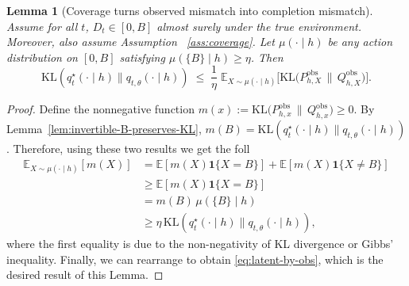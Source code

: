 \documentclass[11pt]{article}
\newtheorem{lemma}{Lemma}
\begin{document}
\begin{lemma}[Coverage turns observed mismatch into completion mismatch]\label{lem:coverage-obs-to-latent}
Assume for all $t$, $D_t\in[0,B]$ almost surely under the true environment. Moreover, also assume Assumption ~\ref{ass:coverage}. Let $\mu(\cdot\mid h)$ be any action distribution on $[0,B]$ satisfying $\mu(\{B\}\mid h)\ge\eta$.
Then
\begin{equation}\label{eq:latent-by-obs}
\mathrm{KL}(q_t^\star(\cdot\mid h)\|q_{t,\theta}(\cdot\mid h))
\;\le\;
\frac{1}{\eta}\;
\mathbb{E}_{X\sim \mu(\cdot\mid h)}
\Big[\mathrm{KL}\big(P^{\mathrm{obs}}_{h,X}\,\|\,Q^{\mathrm{obs}}_{h,X}\big)\Big].
\end{equation}
\end{lemma}

\begin{proof}
Define the nonnegative function $m(x):=\mathrm{KL}\big(P^{\mathrm{obs}}_{h,x}\,\|\,Q^{\mathrm{obs}}_{h,x}\big)\ge 0$.
By Lemma~\ref{lem:invertible-B-preserves-KL}, $m(B)=\mathrm{KL}(q_t^\star(\cdot\mid h)\|q_{t,\theta}(\cdot\mid h))$.
Therefore, using these two results we get the foll
\begin{align*} 
\mathbb{E}_{X\sim\mu(\cdot\mid h)}[m(X)]
&=
\mathbb{E}[m(X)\mathbf{1}\{X=B\}] + \mathbb{E}[m(X)\mathbf{1}\{X \neq B\}] \\
&\ge
\mathbb{E}[m(X)\mathbf{1}\{X=B\}] \\
&=
m(B)\,\mu(\{B\}\mid h) \\
&\ge
\eta\,\mathrm{KL}(q_t^\star(\cdot\mid h)\|q_{t,\theta}(\cdot\mid h)),
\end{align*}
where the first equality is due to the non-negativity of KL divergence or Gibbs' inequality. Finally, we can rearrange to obtain \eqref{eq:latent-by-obs}, which is the desired result of this Lemma.
\end{proof}
\end{document}
